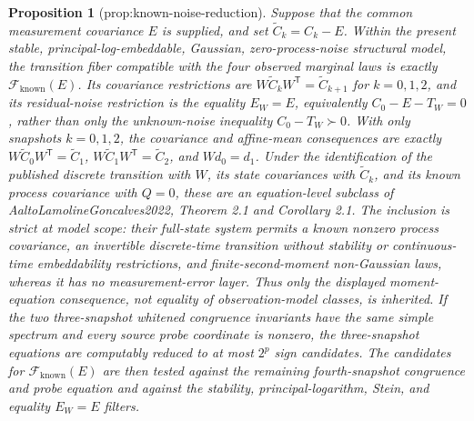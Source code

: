 \documentclass{article}
\newtheorem{proposition}{Proposition}
\begin{document}
\begin{proposition}[prop:known-noise-reduction]\label{prop:known-noise-reduction}
Suppose that the common measurement covariance \(E\) is supplied, and set \(\widetilde C_k=C_k-E\).  Within the present stable, principal-log-embeddable, Gaussian, zero-process-noise structural model, the transition fiber compatible with the four observed marginal laws is exactly \(\mathcal F_{\mathrm{known}}(E)\).  Its covariance restrictions are \(W\widetilde C_kW^{\mathsf T}=\widetilde C_{k+1}\) for \(k=0,1,2\), and its residual-noise restriction is the equality \(E_W=E\), equivalently \(C_0-E-T_W=0\), rather than only the unknown-noise inequality \(C_0-T_W\succ0\).  With only snapshots \(k=0,1,2\), the covariance and affine-mean consequences are exactly \(W\widetilde C_0W^{\mathsf T}=\widetilde C_1\), \(W\widetilde C_1W^{\mathsf T}=\widetilde C_2\), and \(Wd_0=d_1\).  Under the identification of the published discrete transition with \(W\), its state covariances with \(\widetilde C_k\), and its known process covariance with \(Q=0\), these are an equation-level subclass of AaltoLamolineGoncalves2022, Theorem 2.1 and Corollary 2.1.  The inclusion is strict at model scope: their full-state system permits a known nonzero process covariance, an invertible discrete-time transition without stability or continuous-time embeddability restrictions, and finite-second-moment non-Gaussian laws, whereas it has no measurement-error layer.  Thus only the displayed moment-equation consequence, not equality of observation-model classes, is inherited.  If the two three-snapshot whitened congruence invariants have the same simple spectrum and every source probe coordinate is nonzero, the three-snapshot equations are computably reduced to at most \(2^p\) sign candidates.  The candidates for \(\mathcal F_{\mathrm{known}}(E)\) are then tested against the remaining fourth-snapshot congruence and probe equation and against the stability, principal-logarithm, Stein, and equality \(E_W=E\) filters.
\end{proposition}
\end{document}
